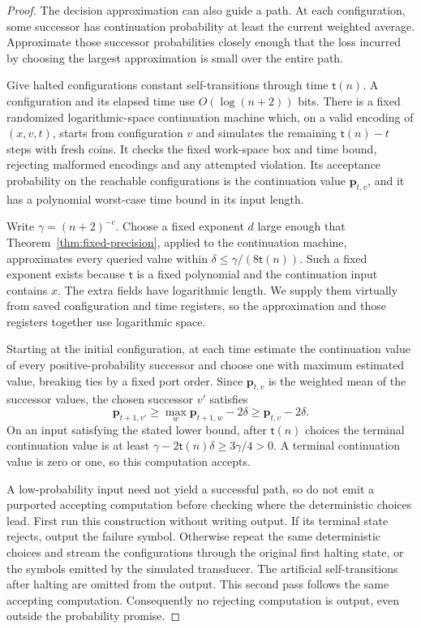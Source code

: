 \documentclass[11pt]{article}
\numberwithin{equation}{section}
\theoremstyle{definition}
\theoremstyle{remark}
\begin{document}
\begin{proof}
The decision approximation can also guide a path. At each configuration, some successor has continuation probability at least the current weighted average. Approximate those successor probabilities closely enough that the loss incurred by choosing the largest approximation is small over the entire path.

Give halted configurations constant self-transitions through time
${\mathsf{t}}(n)$. A configuration and its elapsed time use $O(\log(n+2))$
bits. There is a fixed randomized logarithmic-space continuation
machine which, on a valid encoding of $(x,v,t)$, starts from
configuration $v$ and simulates the remaining ${\mathsf{t}}(n)-t$ steps with
fresh coins. It checks the fixed work-space box and time bound,
rejecting malformed encodings and any attempted violation. Its
acceptance probability on the reachable configurations is the
continuation value ${\mathbf{p}}_{t,v}$, and it has a
polynomial worst-case time bound in its input length.

Write $\gamma=(n+2)^{-c}$. Choose a fixed exponent $d$ large enough
that Theorem~\ref{thm:fixed-precision}, applied to the continuation
machine, approximates every queried value within
$\delta\le\gamma/(8{\mathsf{t}}(n))$. Such a fixed exponent exists because
${\mathsf{t}}$ is a fixed polynomial and the continuation input contains $x$.
The extra fields have logarithmic length. We supply them virtually
from saved configuration and time registers, so the approximation
and those registers together use logarithmic space.

Starting at the initial configuration, at each time estimate the
continuation value of every positive-probability successor and
choose one with maximum estimated value, breaking ties by a fixed
port order. Since ${\mathbf{p}}_{t,v}$ is the weighted mean of the successor
values, the chosen successor $v'$ satisfies
\[
 {\mathbf{p}}_{t+1,v'}\ge\max_w {\mathbf{p}}_{t+1,w}-2\delta
                  \ge {\mathbf{p}}_{t,v}-2\delta.
\]
On an input satisfying the stated lower bound, after ${\mathsf{t}}(n)$ choices
the terminal continuation value is at least
$\gamma-2{\mathsf{t}}(n)\delta\ge3\gamma/4>0$. A terminal continuation value
is zero or one, so this computation accepts.

A low-probability input need not yield a successful path, so do not emit a purported accepting computation before checking where the deterministic choices lead. First run this construction without writing output. If its terminal
state rejects, output the failure symbol. Otherwise repeat the same
deterministic choices and stream the configurations through the original
first halting state, or the symbols emitted by the simulated transducer.
The artificial self-transitions after halting are omitted from the output.
This second pass follows the same accepting computation. Consequently no rejecting computation
is output, even outside the probability promise.


\end{proof}
\end{document}
